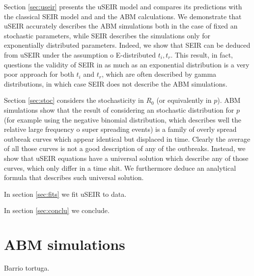 \documentclass[a4paper,oneside,11pt]{article}
\begin{document}
Section \ref{sec:useir} presents the uSEIR model and compares its predictions with the classical SEIR model and and the ABM calculations. We demonstrate that uSEIR accurately describes the ABM simulations both in the case of fixed an stochastic parameters, while SEIR describes the simulations only for exponentially distributed parameters. Indeed, we show that SEIR can be deduced from uSEIR under the assumption o E-distributed $t_i, t_r$. This result, in fact, questions the validity of SEIR in as much as an exponential distribution is a very poor approach for both $t_i$ and $t_r$, which are often described by gamma distributions, in which case SEIR does not describe the ABM simulations. 

Section \ref{sec:stoc} considers the stochasticity in $R_0$ (or equivalently in $p$). ABM simulations show that the result of considering an stochastic distribution for $p$ (for example using the negative binomial distribution, which describes well the relative large frequency o super spreading events) is a family of overly spread outbreak curves which appear identical but displaced in time. Clearly the average of all those curves is not a good description of any of the outbreaks. Instead, we show that uSEIR equations have a universal solution which describe any of those curves, which only differ in a time shit. We furthermore deduce an analytical formula that describes such universal solution. 

In section \ref{sec:fits} we fit uSEIR to data. 

In section \ref{sec:conclu} we conclude. 

\section{ABM simulations} 
\label{abm}
Barrio tortuga. 
\end{document}
